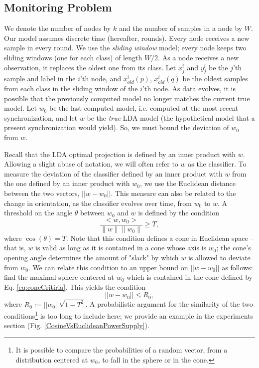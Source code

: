 \subsection{Monitoring Problem}
\label{sub:problem}
We denote the number of nodes by $k$ and the number of samples in a node by $W$.
Our model assumes discrete time (hereafter, rounds). Every node receives a new sample
in every round. We use the \textit{sliding window} model; every node keeps two sliding windows (one for each class) of length $W/2$. As a node receives a new observation, it replaces the oldest one from its class. Let
$x^i_j$ and $y^i_j$ be the $j$'th sample and label in the $i$'th node,
and $x_{old}^i(p)$, $x_{old}^i(q)$ be the oldest samples from each class in
the sliding window of the $i$'th node.
As data evolves, it is possible that the previously computed model
no longer matches the current true model. Let $w_0$ be the last computed model, i.e. computed at the most recent synchronization, and let $w$ be the \textit{true} LDA model (the hypothetical model that a present synchronization would yield). So,
we must bound the deviation of $w_0$ from $w$. 

Recall that the LDA optimal projection is defined by an inner product with
$w$. Allowing a slight abuse of notation,
we will often refer to $w$ as the classifier. 
To measure the deviation of the classifier defined by an inner product
with $w$ from the one defined by an inner product with $w_0$, we use the
Euclidean distance between the two vectors, $||w-w_0||$. This measure
can also be related to the change in orientation, as the classifier
evolves over time, from $w_0$ to $w$. A 
threshold on the angle $\theta$ between $w_0$ and $w$  is defined by the condition
\begin{equation} \label{eq:coneCritiria}
\frac{<w,w_0>}{\parallel w \parallel \parallel w_0 \parallel}  \geq  T,
\end{equation}
where $\cos(\theta) = T$. Note that this condition
defines a cone in Euclidean space -- that is, $w$ is valid as long as it is
contained in a cone whose axis is $w_0$; the cone's opening angle determines
the amount of "slack" by which $w$ is allowed to deviate from $w_0$.
We can relate this condition to an upper bound on $||w-w_0||$ as follows:
find the maximal sphere centered at $w_0$ which is contained in the
cone defined by Eq. \ref{eq:coneCritiria}. This yields the condition
%
\begin{equation} \label{eq:critiria}
||w-w_0||   \leq  R_0,
\end{equation}
where $R_0 := ||w_0|| \sqrt{1-T^2}$. A probabilistic argument for
the similarity of the two conditions\footnote{It is possible to compare the probabilities of a random vector, from a
distribution centered at $w_0$, to fall in the sphere or in the cone.} is too long to 
include here; we provide an example in the experiments section 
(Fig. \ref{CosineVsEuclideanPowerSupply}).

